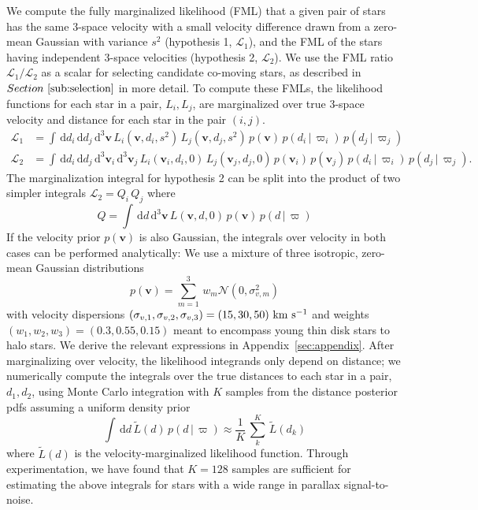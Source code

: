 \documentclass[manuscript, letterpaper]{aastex6}
\newcommand{\sectionname}{Section}
\newcommand{\given}{\,|\,}
\newcommand{\dd}{\mathrm{d}}
\newcommand{\bs}[1]{\boldsymbol{#1}}
\renewcommand{\vec}[1]{\bs{#1}}
\newcommand{\kms}{\ensuremath{\rm km~s^{-1}}}
\begin{document}
We compute the fully marginalized likelihood (FML) that a given pair of stars
has the same 3-space velocity with a small velocity difference drawn from a
zero-mean Gaussian with variance $s^2$ (hypothesis 1, $\mathcal{L}_1$), and
the FML of the stars having independent 3-space velocities (hypothesis 2,
$\mathcal{L}_2$).
We use the FML ratio $\mathcal{L}_1/\mathcal{L}_2$ as a scalar for selecting
candidate co-moving stars, as described in $\sectionname~\ref{sub:selection}$ in
more detail.
To compute these FMLs, the likelihood functions for each star in a pair, $L_i,
L_j$, are marginalized over true 3-space velocity and distance for each star in
the pair $(i,j)$.
\begin{align}
  \mathcal{L}_1 &=
    \int \, \dd d_i \, \dd d_j \, \dd^3 \vec{v} \,
    L_i(\vec{v}, d_i, s^2) \,
    L_j(\vec{v}, d_j, s^2) \,
    p(\vec{v}) \, p(d_i \given \varpi_i) \, p(d_j \given \varpi_j) \\
  \mathcal{L}_2 &=
    \int \, \dd d_i \, \dd d_j \, \dd^3 \vec{v}_i \, \dd^3 \vec{v}_j \,
    L_i(\vec{v}_i, d_i, 0) \,
    L_j(\vec{v}_j, d_j, 0) \,
    p(\vec{v}_i) \, p(\vec{v}_j) \, p(d_i \given \varpi_i) \, p(d_j \given \varpi_j). \label{eq:hyp2}
\end{align}
The marginalization integral for hypothesis 2 can be split into the product of
two simpler integrals $\mathcal{L}_2 = Q_i \, Q_j$ where
\begin{equation}
  Q = \int \, \dd d \, \dd^3 \vec{v} \, L(\vec{v}, d, 0) \, p(\vec{v}) \, p(d\given\varpi)
\end{equation}
If the velocity prior $p(\vec{v})$ is also Gaussian, the integrals over velocity
in both cases can be performed analytically:
We use a mixture of three isotropic, zero-mean Gaussian distributions
\begin{equation}
  p(\vec{v}) = \sum_{m=1}^3 \, w_m \mathcal{N}(0, \sigma_{v,m}^2)
\end{equation}
with velocity dispersions $(\sigma_{v,1}, \sigma_{v,2}, \sigma_{v,3}) = (15, 30, 50)
~\kms$ and weights $(w_1,w_2,w_3) = (0.3, 0.55, 0.15)$
meant to encompass young thin disk stars to halo stars.
We derive the relevant expressions in Appendix~\ref{sec:appendix}.
After marginalizing over velocity, the likelihood integrands only depend on
distance; we numerically compute the integrals over the true distances to each
star in a pair, $d_1,d_2$, using Monte Carlo integration with $K$ samples from
the distance posterior pdfs assuming a uniform density prior
\citep{Bailer-Jones:2015aa}
\begin{equation}
  \int \, \dd d \, \tilde{L}(d) \, p(d\given\varpi) \approx
    \frac{1}{K} \, \sum_k^K \, \tilde{L}(d_k)
\end{equation}
where $\tilde{L}(d)$ is the velocity-marginalized likelihood function.
Through experimentation, we have found that $K=128$ samples are sufficient for
estimating the above integrals for stars with a wide range in parallax
signal-to-noise.
\end{document}
